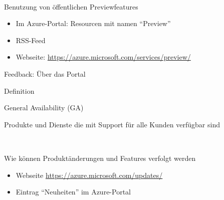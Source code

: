 \documentclass{scrartcl}
\newenvironment{flashcard}[2][]{%
    #1
    \vfill
    \centerline{\Large{#2}}
    \vfill
\newpage
}
{\newpage}
\begin{document}
    \begin{flashcard}[\ ]{Benutzung von öffentlichen Previewfeatures}
        \begin{itemize}
            \item Im Azure-Portal: Resourcen mit namen ``Preview''
            \item RSS-Feed
            \item Webseite: \href{https://azure.microsoft.com/services/preview/}{https://azure.microsoft.com/services/preview/}
        \end{itemize}

        \vspace{5mm}
        Feedback: Über das Portal
    \end{flashcard}

    \begin{flashcard}[Definition]{General Availability (GA)}
        Produkte und Dienste die mit Support für alle Kunden verfügbar sind
    \end{flashcard}

    \begin{flashcard}[\ ]{Wie können Produktänderungen und Features verfolgt werden}
        \begin{itemize}
            \item Webseite \href{https://azure.microsoft.com/updates/}{https://azure.microsoft.com/updates/}
            \item Eintrag ``Neuheiten'' im Azure-Portal
        \end{itemize}

    \end{flashcard}

    \doclicenseThis
    \pagebreak
\end{document}
